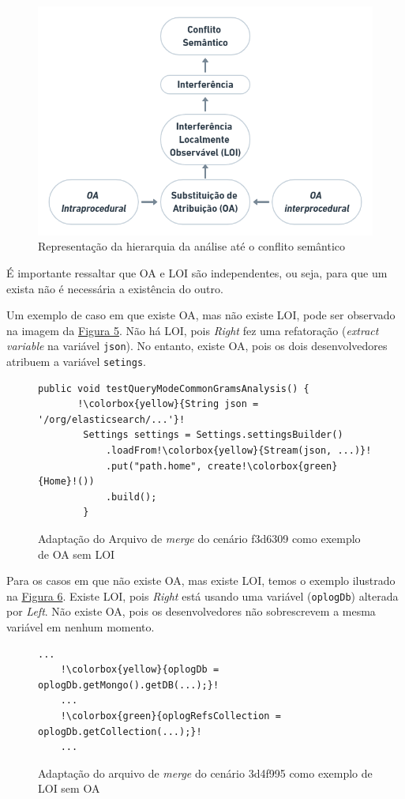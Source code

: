 \begin{figure}[!h]
    \centering
    \includegraphics[width=0.8\linewidth]{images/analysis.png}
    \caption{Representação da hierarquia da análise até o conflito semântico}
    \label{fig:analysis}
\end{figure}

É importante ressaltar que OA e LOI são independentes, ou seja, para que um exista não é necessária a existência do outro.

Um exemplo de caso em que existe OA, mas não existe LOI, pode ser observado na imagem da \hyperref[fig:f3d6309]{Figura 5}. Não há LOI, pois \emph{Right} fez uma refatoração (\emph{extract variable} na variável \texttt{json}). No entanto, existe OA, pois os dois desenvolvedores atribuem a variável \texttt{setings}.

\begin{figure}[!h]
    \begin{lstlisting}[escapechar=!]
    public void testQueryModeCommonGramsAnalysis() {
       !\colorbox{yellow}{String json = '/org/elasticsearch/...'}!
        Settings settings = Settings.settingsBuilder()
            .loadFrom!\colorbox{yellow}{Stream(json, ...)}!
            .put("path.home", create!\colorbox{green}{Home}!())
            .build();
        }
    \end{lstlisting}
    \caption{Adaptação do Arquivo de \emph{merge} do cenário f3d6309 como exemplo de OA sem LOI}
    \label{fig:f3d6309}
\end{figure}

Para os casos em que não existe OA, mas existe LOI, temos o exemplo ilustrado na \hyperref[fig:3d4f995]{Figura 6}. Existe LOI, pois \emph{Right} está usando uma variável (\texttt{oplogDb}) alterada por \emph{Left}. Não existe OA, pois os desenvolvedores não sobrescrevem a mesma variável em nenhum momento.

\begin{figure}[!h]
    \begin{lstlisting}[escapechar=!]
    ...
    !\colorbox{yellow}{oplogDb = oplogDb.getMongo().getDB(...);}!
    ...
    !\colorbox{green}{oplogRefsCollection = oplogDb.getCollection(...);}!
    ...
    \end{lstlisting}
     \caption{Adaptação do arquivo de \emph{merge} do cenário 3d4f995 como exemplo de LOI sem OA}
    \label{fig:3d4f995}
\end{figure}